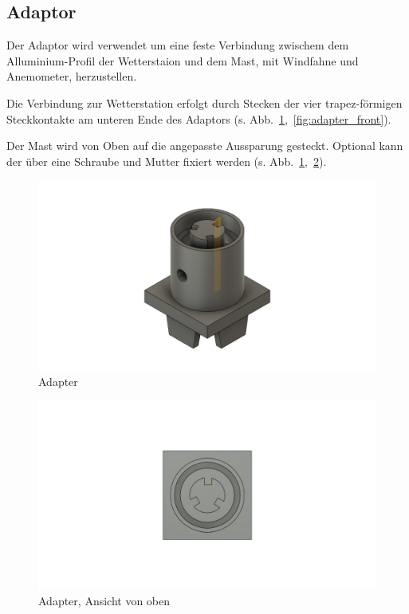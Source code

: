 \subsection{Adaptor}\label{sec:ge_adapt}
Der Adaptor wird verwendet um eine feste Verbindung zwischem dem Alluminium-Profil der Wetterstaion und dem Mast, mit Windfahne und Anemometer, herzustellen.

Die Verbindung zur Wetterstation erfolgt durch Stecken der vier trapez-förmigen Steckkontakte am unteren Ende des Adaptors (s. Abb.~\ref{fig:adapter},~\ref{fig:adapter_front}).

Der Mast wird von Oben auf die angepasste Aussparung gesteckt. Optional kann der über eine Schraube und Mutter fixiert werden (s. Abb.~\ref{fig:adapter},~\ref{fig:adapter_top}).
\begin{figure}[H]
  \centering
  \includegraphics[width=\textwidth]{./img/ST_Adapterv4}
  \caption{Adapter}\label{fig:adapter}
\end{figure}
\begin{figure}[H]
  \centering
  \includegraphics[width=\textwidth]{./img/ST_Adapterv4_top}
  \caption{Adapter, Ansicht von oben}\label{fig:adapter_top}
\end{figure}

